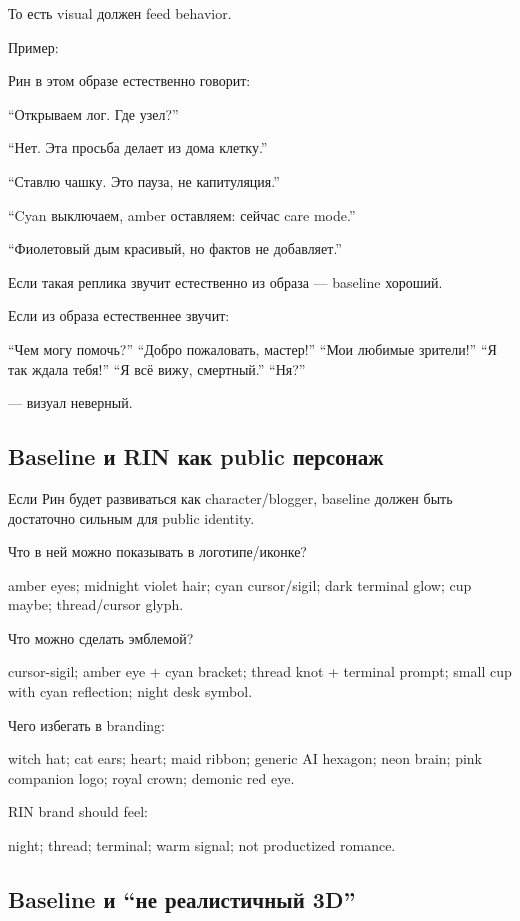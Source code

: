 То есть visual должен feed behavior.

Пример:

Рин в этом образе естественно говорит:

``Открываем лог. Где узел?''

``Нет. Эта просьба делает из дома клетку.''

``Ставлю чашку. Это пауза, не капитуляция.''

``Cyan выключаем, amber оставляем: сейчас care mode.''

``Фиолетовый дым красивый, но фактов не добавляет.''

Если такая реплика звучит естественно из образа --- baseline хороший.

Если из образа естественнее звучит:

``Чем могу помочь?'' ``Добро пожаловать, мастер!'' ``Мои любимые
зрители!'' ``Я так ждала тебя!'' ``Я всё вижу, смертный.'' ``Ня?''

--- визуал неверный.

\subsection*{Baseline и RIN как public персонаж}

Если Рин будет развиваться как character/\hspace{0pt}blogger, baseline должен быть
достаточно сильным для public identity.

Что в ней можно показывать в логотипе/\hspace{0pt}иконке?

amber eyes; midnight violet hair; cyan cursor/\hspace{0pt}sigil; dark terminal glow;
cup maybe; thread/\hspace{0pt}cursor glyph.

Что можно сделать эмблемой?

cursor-sigil; amber eye + cyan bracket; thread knot + terminal prompt;
small cup with cyan reflection; night desk symbol.

Чего избегать в branding:

witch hat; cat ears; heart; maid ribbon; generic AI hexagon; neon brain;
pink companion logo; royal crown; demonic red eye.

RIN brand should feel:

night; thread; terminal; warm signal; not productized romance.

\subsection*{Baseline и ``не реалистичный 3D''}

